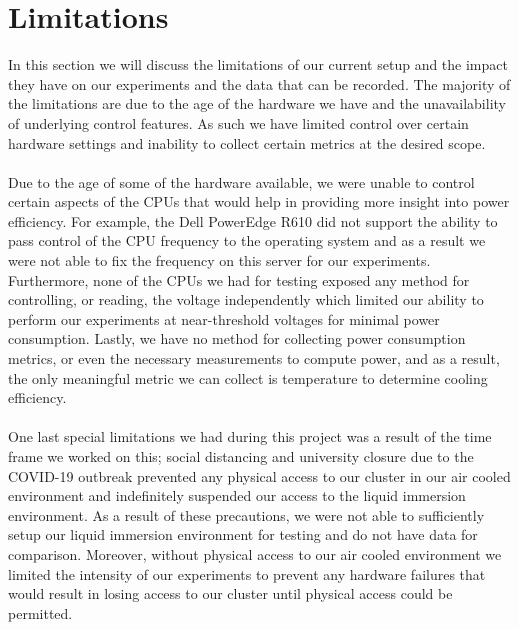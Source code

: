 \documentclass[sigconf]{acmart}
\begin{document}
\section{Limitations}
In this section we will discuss the limitations of our current setup and the impact they have on our experiments and the data that can be recorded. The majority of the limitations are due to the age of the hardware we have and the unavailability of underlying control features. As such we have limited control over certain hardware settings and inability to collect certain metrics at the desired scope.
\\\\
Due to the age of some of the hardware available, we were unable to control certain aspects of the CPUs that would help in providing more insight into power efficiency. For example, the Dell PowerEdge R610 did not support the ability to pass control of the CPU frequency to the operating system and as a result we were not able to fix the frequency on this server for our experiments. Furthermore, none of the CPUs we had for testing exposed any method for controlling, or reading, the voltage independently which limited our ability to perform our experiments at near-threshold voltages for minimal power consumption. Lastly, we have no method for collecting power consumption metrics, or even the necessary measurements to compute power, and as a result, the only meaningful metric we can collect is temperature to determine cooling efficiency. 
\\\\
One last special limitations we had during this project was a result of the time frame we worked on this; social distancing and university closure due to the COVID-19 outbreak prevented any physical access to our cluster in our air cooled environment and indefinitely suspended our access to the liquid immersion environment. As a result of these precautions, we were not able to sufficiently setup our liquid immersion environment for testing and do not have data for comparison. Moreover, without physical access to our air cooled environment we limited the intensity of our experiments to prevent any hardware failures that would result in losing access to our cluster until physical access could be permitted. 
\end{document}
